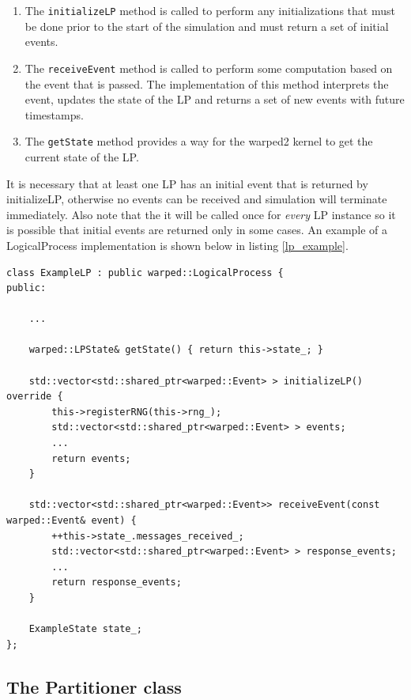 \documentclass[11pt]{book}
\begin{document}
\begin{enumerate}
    \item The \texttt{initializeLP} method is called to perform any initializations that must
        be done prior to the start of the simulation and must return a set of initial events.
    \item The \texttt{receiveEvent} method is called to perform some computation based on
        the event that is passed. The implementation of this method interprets the event,
        updates the state of the LP and returns a set of new events with future timestamps.
    \item The \texttt{getState} method provides a way for the warped2 kernel to get the current
        state of the LP.
\end{enumerate}

It is necessary that at least one LP has an initial event that is returned by
initializeLP, otherwise no events can be received and simulation will terminate immediately.
Also note that the it will be called once for \emph{every} LP instance so it is possible that
initial events are returned only in some cases. An example of a LogicalProcess implementation
is shown below in listing \ref{lp_example}.

\begin{lstlisting}[caption=Example \textsc{warped2} LogicalProcess Definition, label=lp_example, float]
class ExampleLP : public warped::LogicalProcess {
public:

    ...

    warped::LPState& getState() { return this->state_; }

    std::vector<std::shared_ptr<warped::Event> > initializeLP() override {
        this->registerRNG(this->rng_);
        std::vector<std::shared_ptr<warped::Event> > events;
        ...
        return events;
    }

    std::vector<std::shared_ptr<warped::Event>> receiveEvent(const warped::Event& event) {
        ++this->state_.messages_received_;
        std::vector<std::shared_ptr<warped::Event> > response_events;
        ...
        return response_events;
    }

    ExampleState state_;
};
\end{lstlisting}

\subsection{The Partitioner class}\label{partitioner}
\end{document}
